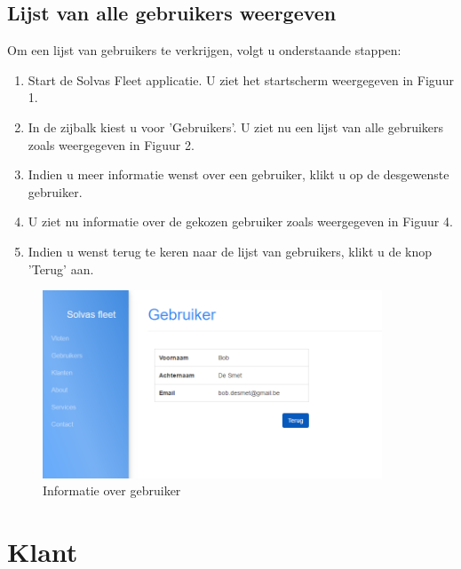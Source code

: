 \documentclass[11pt,openany]{article}
\begin{document}
\subsection{Lijst van alle gebruikers weergeven}
Om een lijst van gebruikers te verkrijgen, volgt u onderstaande stappen:
\begin{enumerate}
		\item Start de Solvas Fleet applicatie. U ziet het startscherm weergegeven in Figuur 1.
		\item In de zijbalk kiest u voor 'Gebruikers'. U ziet nu een lijst van alle gebruikers zoals weergegeven in Figuur 2.
		\item Indien u meer informatie wenst over een gebruiker, klikt u op de desgewenste gebruiker. 
		\item U ziet nu informatie over de gekozen gebruiker zoals weergegeven in Figuur 4. 
		\item Indien u wenst terug te keren naar de lijst van gebruikers, klikt u de knop 'Terug' aan.
\end{enumerate}

\begin{figure}
	\centering
	\includegraphics[width=0.9\textwidth]{fig4.png}
	\caption{Informatie over gebruiker}
\end{figure}


\newpage

\section{Klant}
\end{document}
